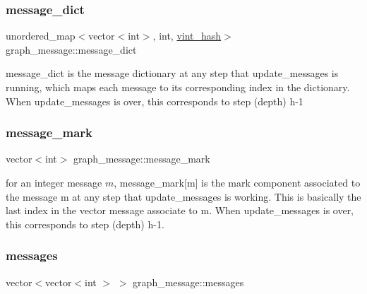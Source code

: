 \mbox{\label{classgraph__message_a557473b726dc5d80618055a6b843670f}} 
\subsubsection{\texorpdfstring{message\+\_\+dict}{message\_dict}}
{\footnotesize\ttfamily unordered\+\_\+map$<$vector$<$int$>$, int, \hyperlink{structvint__hash}{vint\+\_\+hash}$>$ graph\+\_\+message\+::message\+\_\+dict}



message\+\_\+dict is the message dictionary at any step that update\+\_\+messages is running, which maps each message to its corresponding index in the dictionary. When update\+\_\+messages is over, this corresponds to step (depth) h-\/1 

\mbox{\label{classgraph__message_a49d9af5150daf0599c29fe18cb032fa5}} 
\subsubsection{\texorpdfstring{message\+\_\+mark}{message\_mark}}
{\footnotesize\ttfamily vector$<$int$>$ graph\+\_\+message\+::message\+\_\+mark}



for an integer message $m$, message\+\_\+mark\mbox{[}m\mbox{]} is the mark component associated to the message m at any step that update\+\_\+messages is working. This is basically the last index in the vector message associate to m. When update\+\_\+messages is over, this corresponds to step (depth) h-\/1. 

\mbox{\label{classgraph__message_af680c8a1755cf8d4aba389c1a3d6634e}} 
\subsubsection{\texorpdfstring{messages}{messages}}
{\footnotesize\ttfamily vector$<$vector$<$int $>$ $>$ graph\+\_\+message\+::messages}



